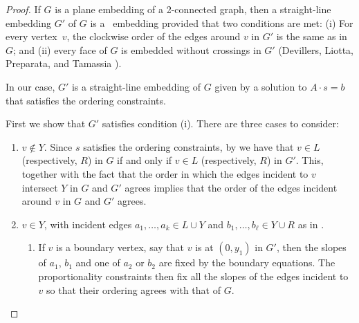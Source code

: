 \begin{proof}
	If $G$ is a plane embedding of a 2-connected graph, then a
	straight-line embedding $G'$ of $G$ is a \Fary\ embedding provided
	that two conditions are met:
	(i) For every vertex~$v$, the clockwise order of the
	edges around $v$ in $G'$ is the same as in $G$; and
	(ii) every face of $G$ is embedded without crossings in $G'$
	(Devillers, Liotta, Preparata, and Tamassia \cite[Lemma~16]{devillers.liotta.ea:checking}).
	
	In our case, $G'$ is a straight-line embedding of $G$ given by a solution
	to $A\cdot s = b$ that satisfies the ordering constraints.  
	
	
	First we show that $G'$ satisfies condition (i). There are three cases to consider:
	\begin{enumerate}
		\item $v\not\in Y$. Since $s$ satisfies the ordering constraints, by  we have that $v\in L$ (respectively, $R$) in $G$ if and only if $v\in L$ (respectively, $R$) in $G'$. This, together with the fact that the order in which the edges incident to $v$ intersect $Y$ in $G$ and $G'$ agrees implies that the  order of the edges incident around $v$ in $G$ and $G'$ agrees.
		
		\item
		$v\in Y$, with incident edges $a_1,\ldots,a_k\in
		L\cup Y$ and $b_1,\ldots,b_\ell\in Y\cup R$ as in . 
		\begin{enumerate}
			\item If $v$ is a boundary vertex, say that $v$ is at $(0,y_1)$ in $G'$, then the slopes of $a_1$, $b_1$ and one of $a_2$ or $b_2$ are fixed by the boundary equations.  The proportionality
			constraints then fix all the slopes of the edges incident to $v$ so that
			their ordering agrees with that of $G$.
			

\end{enumerate}
\end{enumerate}
\end{proof}
